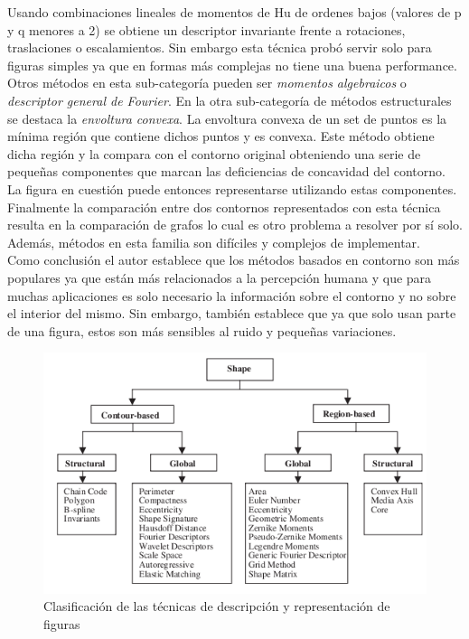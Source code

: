Usando combinaciones lineales de momentos de Hu de ordenes bajos 
(valores de p y q menores a 2) se obtiene un descriptor 
invariante frente a rotaciones, traslaciones o escalamientos. Sin embargo esta técnica probó servir solo 
para figuras simples ya que en formas más complejas no tiene una buena performance. Otros métodos en esta
sub-categoría pueden ser \textit{momentos algebraicos} o \textit{descriptor general de Fourier}. En la otra sub-categoría de métodos
estructurales se destaca la \textit{envoltura convexa}. La envoltura convexa de un set de puntos es la mínima región que contiene 
dichos puntos y es convexa. Este método obtiene dicha región y la compara con el contorno original obteniendo una serie de pequeñas
componentes que marcan las deficiencias de concavidad del contorno. La 
figura en cuestión puede entonces representarse utilizando estas componentes.
Finalmente la comparación entre dos contornos representados con esta 
técnica resulta en la comparación de grafos lo cual es otro
problema a resolver por sí solo. Además, métodos en esta familia son difíciles y complejos de implementar.\\
\indent Como conclusión el autor establece que los métodos basados en contorno son más populares ya que están más relacionados
a la percepción humana y que para muchas aplicaciones es solo necesario la información sobre el contorno y no sobre el interior del mismo.
Sin embargo, también establece que ya que solo usan parte de una figura, estos son más sensibles al ruido y pequeñas variaciones.

\begin{figure}[tpb]
\begin{center}
  \includegraphics[scale=0.55]{figuras/shapess.png}
\end{center}
  \caption{Clasificación de las técnicas de descripción y representación de figuras}
  \label{fig:review_shape}
\end{figure}

